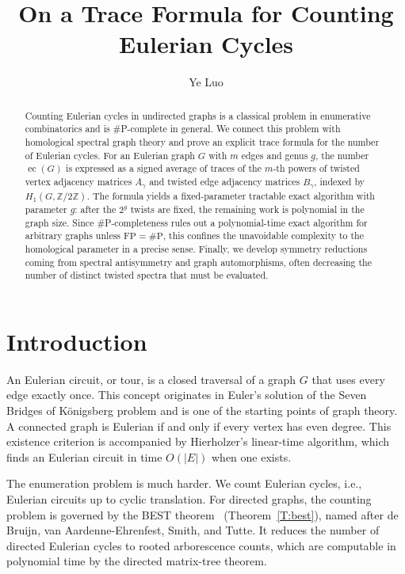 \documentclass[11pt]{amsart}
\makeatletter
\renewcommand{\email}[2][]{%
  \ifx\emails\@empty\relax\else{\g@addto@macro\emails{,\space}}\fi%
  \@ifnotempty{#1}{\g@addto@macro\emails{\textrm{(#1)}\space}}%
  \g@addto@macro\emails{#2}%
}
\theoremstyle{plain}
\theoremstyle{definition}
\newcommand{\mbbZ}{{\mathbb Z}}
\DeclareMathOperator{\ec}{\operatorname{ec}}
\numberwithin{equation}{section}
\makeatother
\begin{document}
\title{On a Trace Formula for Counting Eulerian Cycles}
\author{Ye Luo} 
\address[A1]{School of Informatics, Xiamen University, Xiamen, Fujian 361005, China}
\email[A1]{luoye@xmu.edu.cn}



\date{}



\begin{abstract}
Counting Eulerian cycles in undirected graphs is a classical problem in enumerative combinatorics and is \#P-complete in general.  We connect this problem with homological spectral graph theory and prove an explicit trace formula for the number of Eulerian cycles.  For an Eulerian graph $G$ with $m$ edges and genus $g$, the number $\ec(G)$ is expressed as a signed average of traces of the $m$-th powers of twisted vertex adjacency matrices $A_\gamma$ and twisted edge adjacency matrices $B_\gamma$, indexed by $H_1(G,\mbbZ/2\mbbZ)$.  The formula yields a fixed-parameter tractable exact algorithm with parameter $g$: after the $2^g$ twists are fixed, the remaining work is polynomial in the graph size.  Since \#P-completeness rules out a polynomial-time exact algorithm for arbitrary graphs unless $\mathrm{FP}=\#\mathrm{P}$, this confines the unavoidable complexity to the homological parameter in a precise sense.  Finally, we develop symmetry reductions coming from spectral antisymmetry and graph automorphisms, often decreasing the number of distinct twisted spectra that must be evaluated.
\end{abstract}

\maketitle
\section{Introduction}
An Eulerian circuit, or tour, is a closed traversal of a graph $G$ that uses every edge exactly once.  This concept originates in Euler's solution of the Seven Bridges of K\"onigsberg problem and is one of the starting points of graph theory.  A connected graph is Eulerian if and only if every vertex has even degree.  This existence criterion is accompanied by Hierholzer's linear-time algorithm, which finds an Eulerian circuit in time $O(|E|)$ when one exists.

The enumeration problem is much harder.  We count Eulerian cycles, i.e., Eulerian circuits up to cyclic translation.  For directed graphs, the counting problem is governed by the BEST theorem~\cite{AB1951circuits} (Theorem~\ref{T:best}), named after de Bruijn, van Aardenne-Ehrenfest, Smith, and Tutte.  It reduces the number of directed Eulerian cycles to rooted arborescence counts, which are computable in polynomial time by the directed matrix-tree theorem.
\end{document}
